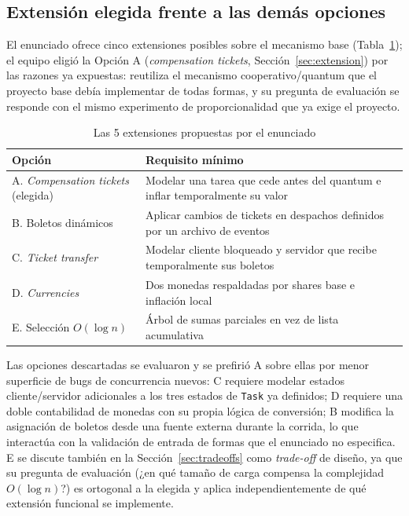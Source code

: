 \subsection{Extensión elegida frente a las demás opciones}

El enunciado ofrece cinco extensiones posibles sobre el mecanismo base
(Tabla~\ref{tab:opciones}); el equipo eligió la Opción A
(\textit{compensation tickets}, Sección~\ref{sec:extension}) por las razones
ya expuestas: reutiliza el mecanismo cooperativo/quantum que el proyecto
base debía implementar de todas formas, y su pregunta de evaluación se
responde con el mismo experimento de proporcionalidad que ya exige el
proyecto.

\begin{table}[htbp]
\caption{Las 5 extensiones propuestas por el enunciado}
\label{tab:opciones}
\centering
\renewcommand{\arraystretch}{1.25}
\begin{tabular}{p{2.3cm}p{6.0cm}}
\toprule
\textbf{Opción} & \textbf{Requisito mínimo} \\
\midrule
A. \textit{Compensation tickets} (elegida) & Modelar una tarea que cede antes del quantum e inflar temporalmente su valor \\
\midrule
B. Boletos dinámicos & Aplicar cambios de tickets en despachos definidos por un archivo de eventos \\
\midrule
C. \textit{Ticket transfer} & Modelar cliente bloqueado y servidor que recibe temporalmente sus boletos \\
\midrule
D. \textit{Currencies} & Dos monedas respaldadas por shares base e inflación local \\
\midrule
E. Selección $O(\log n)$ & Árbol de sumas parciales en vez de lista acumulativa \\
\bottomrule
\end{tabular}
\end{table}

Las opciones descartadas se evaluaron y se prefirió A sobre ellas por menor
superficie de bugs de concurrencia nuevos: C requiere modelar estados
cliente/servidor adicionales a los tres estados de \texttt{Task} ya
definidos; D requiere una doble contabilidad de monedas con su propia
lógica de conversión; B modifica la asignación de boletos desde una fuente
externa durante la corrida, lo que interactúa con la validación de entrada
de formas que el enunciado no especifica. E se discute también en la
Sección~\ref{sec:tradeoffs} como \textit{trade-off} de diseño, ya que su
pregunta de evaluación (¿en qué tamaño de carga compensa la complejidad
$O(\log n)$?) es ortogonal a la elegida y aplica independientemente de qué
extensión funcional se implemente.

